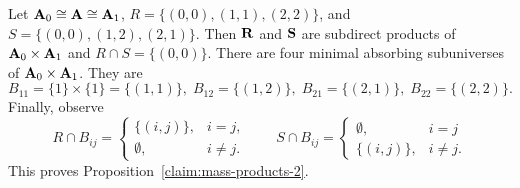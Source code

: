 \begin{example}
Let $\mathbf{A}_0 \cong \mathbf{A} \cong \mathbf{A}_1$, $R = \{(0,0), (1,1), (2,2)\}$, and
$S = \{(0,0), (1,2), (2,1)\}$.  Then $\mathbf{R}$ and $\mathbf{S}$ are subdirect products of
$\mathbf{A}_0\times \mathbf{A}_1$ and $R\cap S= \{(0,0)\}$.  There are four minimal absorbing subuniverses of
$\mathbf{A}_0 \times \mathbf{A}_1$.  They are
\[
B_{11} = \{1\}\times \{1\} = \{(1,1)\} , \; B_{12} = \{(1, 2)\}, \; B_{21} = \{(2, 1)\},
\; B_{22} = \{(2, 2)\}.
\]
Finally, observe
\[
R\cap B_{ij} = \begin{cases}
  \{(i,j)\}, & i=j,\\
  \emptyset, & i\neq j.
\end{cases}
\qquad 
S\cap B_{ij} = \begin{cases}
  \emptyset, & i=j\\
  \{(i,j)\}, & i\neq j.
\end{cases}
\]
This proves Proposition~\ref{claim:mass-products-2}.

\end{example}

